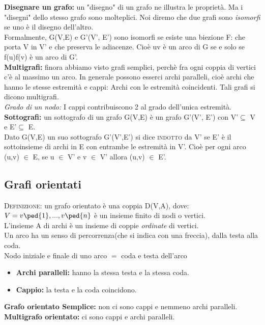 \noindent
\textbf{Disegnare un grafo:} un "disegno" di un grafo ne illustra le proprietà. Ma i "disegni" dello stesso grafo sono molteplici. Noi
diremo che due grafi sono \emph{isomorfi} se uno è il disegno dell'altro. \\
Formalmente, G(V,E) e G’(V’, E’) sono isomorfi se esiste una biezione F: che porta V in V’ e che preserva le
adiacenze. Cioè uv è un arco di G se e solo se f(u)f(v) è un arco di G’. \\
\textbf{Multigrafi:} finora abbiamo visto grafi semplici, perchè fra ogni coppia di vertici c'è al massimo un arco. In generale possono esserci archi paralleli, cioè archi che hanno le stesse estremità e cappi: Archi
con le estremità coincidenti. Tali grafi si dicono multigrafi. \\
\textit{Grado di un nodo:} I cappi contribuiscono 2 al grado dell'unica estremità.\\
\textbf{Sottografi:} un sottografo di un grafo G(V,E) è un grafo G'(V', E') con V'$\subseteq$ V e E'$\subseteq$ E. \\
Dato G(V,E) un suo sottografo G'(V',E') si dice \textsc{indotto} da V' se E' è il sottoinsieme di archi in E con entrambe le estremità in V'. Cioè per ogni arco (u,v) $\in$ E, se u $\in$ V' e v $\in$ V' allora (u,v) $\in$ E'. 

\subsection{Grafi orientati}
\textsc{Definizione:} un grafo orientato è una coppia D(V,A), dove: \\
\( V={ v\ped{1}, ...,v\ped{n}} \) è un insieme finito di nodi o vertici. \\
L'insieme A di archi è un insieme di coppie \emph{ordinate} di vertici. \\
Un arco ha un senso di percorrenza(che si indica con una freccia), dalla testa alla coda. \\

Nodo iniziale e finale di uno arco $=$ coda e testa dell'arco
\begin{itemize}
\item \textbf{Archi paralleli:} hanno la stessa testa e la stessa coda.
\item \textbf{Cappio:} la testa e la coda coincidono.
\end{itemize}
\textbf{Grafo orientato Semplice:} non ci sono cappi e nemmeno archi paralleli.
\textbf{Multigrafo orientato:} ci sono cappi e archi paralleli. 

